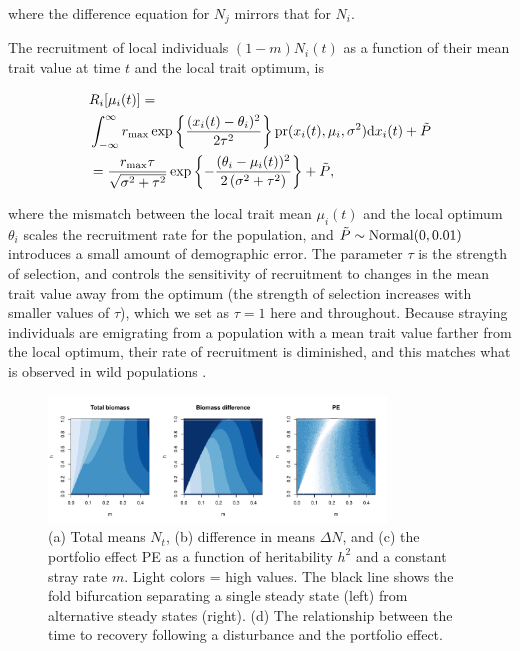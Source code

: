 \documentclass[twocolumn,preprintnumbers,amsmath,amssymb,superscriptaddress]{revtex4}
\begin{document}
\noindent where the difference equation for $N_j$ mirrors that for $N_i$.

The recruitment of local individuals $(1-m)N_i(t)$ as a function of their mean trait value at time $t$ and the local trait optimum, is

\begin{align}
  &R_i[\mu_i(t)] = \\ \nonumber
  &\int_{-\infty}^\infty r_{\rm max}\exp\left\{\frac{(x_i(t)-\theta_i)^2}{2\tau^2}\right\} {\rm pr}(x_i(t),\mu_i,\sigma^2) {\rm d}x_i(t) +\tilde{P}\\ \nonumber
  &= \frac{r_{\rm max} \tau  }{\sqrt{\sigma ^2+\tau ^2}}\exp\left\{-\frac{(\theta_i-\mu_i(t))^2}{2 \left(\sigma ^2+\tau ^2\right)}\right\} +\tilde{P},
  \label{eq:R}
\end{align}

\noindent where the mismatch between the local trait mean $\mu_i(t)$ and the local optimum $\theta_i$ scales the recruitment rate for the population, and $\tilde{P}\sim {\rm Normal}(0,0.01)$ introduces a small amount of demographic error.
The parameter $\tau$ is the strength of selection, and controls the sensitivity of recruitment to changes in the mean trait value away from the optimum (the strength of selection increases with smaller values of $\tau$), which we set as $\tau=1$ here and throughout.
Because straying individuals are emigrating from a population with a mean trait value farther from the local optimum, their rate of recruitment is diminished, and this matches what is observed in wild populations \cite{Peterson:2014gy}.
\\

\begin{figure}
  \captionsetup{justification=raggedright,
singlelinecheck=false
}
\centering
\includegraphics[width=0.8\textwidth]{figs2/fig_MDPE_hm.pdf}
\caption{
(a) Total means $N_t$, (b) difference in means $\Delta N$, and (c) the portfolio effect PE as a function of heritability $h^2$ and a constant stray rate $m$. Light colors = high values.
The black line shows the fold bifurcation separating a single steady state (left) from alternative steady states (right).
(d) The relationship between the time to recovery following a disturbance and the portfolio effect.
} \label{fig:PE}
\end{figure}
\end{document}
